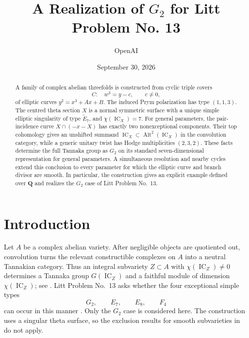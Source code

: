 \documentclass[10pt]{amsart}
\title[A realization of $G_2$ for Litt Problem No. 13]
      {A Realization of $G_2$ for Litt Problem No. 13}
\author{OpenAI}
\date{September 30, 2026}
\numberwithin{equation}{section}
\theoremstyle{definition}
\theoremstyle{remark}
\newcommand{\QQ}{\mathbf Q}
\newcommand{\IC}{\operatorname{IC}}
\newcommand{\Alt}{\operatorname{Alt}}
\newcommand{\wt}{\widetilde}
\begin{document}
\raggedbottom

\begin{abstract}
A family of complex abelian threefolds is constructed from cyclic triple covers
\[
  C:\quad w^3=y-c,\qquad c\ne0,
\]
of elliptic curves $y^2=x^3+Ax+B$.  The induced Prym polarization has type
$(1,1,3)$.  The centred theta section $X$ is a normal symmetric surface with
a unique simple elliptic singularity of type $\wt E_7$, and
$\chi(\IC_X)=7$.  For general parameters, the pair-incidence curve
$X\cap(-x-X)$ has exactly two nonexceptional components.  Their top
cohomology gives an unshifted summand $\IC_X\subset\Alt^2(\IC_X)$ in the
convolution category, while a generic unitary twist has Hodge multiplicities
$(2,3,2)$.  These facts determine the full Tannaka group as $G_2$ on its
standard seven-dimensional representation for general parameters.
A simultaneous resolution and nearby cycles extend this conclusion to
every parameter for which the elliptic curve and branch divisor are smooth.
In particular, the construction gives an explicit example defined over
$\QQ$ and realizes the $G_2$ case of Litt Problem No.~13.
\end{abstract}

\maketitle

\section{Introduction}

Let $A$ be a complex abelian variety.  After negligible objects are
quotiented out, convolution turns the relevant constructible complexes on
$A$ into a neutral Tannakian category.  Thus an integral subvariety
$Z\subset A$ with $\chi(\IC_Z)\ne0$ determines a Tannaka group
$G(\IC_Z)$ and a faithful module of dimension $\chi(\IC_Z)$; see
\cite[Proposition~3.1 and Definition~3.2]{JKLM2025}.  Litt Problem No.~13 asks whether the four
exceptional simple types
\[
  G_2,\qquad E_7,\qquad E_8,\qquad F_4
\]
can occur in this manner \cite{Litt13}.  Only the $G_2$ case is considered
here.  The construction
uses a singular theta surface, so the exclusion results for smooth
subvarieties in \cite{KLM2026} do not apply.
\end{document}
